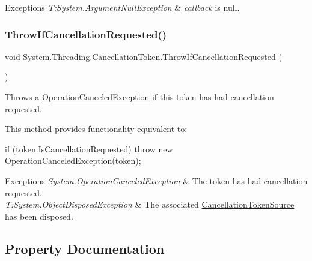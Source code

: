 \begin{DoxyExceptions}{Exceptions}
{\em T\+:\+System.\+Argument\+Null\+Exception} & {\itshape callback}  is null.\\
\hline
\end{DoxyExceptions}
\mbox{\label{struct_system_1_1_threading_1_1_cancellation_token_ab98969cae74910bdbdde565b167c5499}} 
\subsubsection{\texorpdfstring{Throw\+If\+Cancellation\+Requested()}{ThrowIfCancellationRequested()}}
{\footnotesize\ttfamily void System.\+Threading.\+Cancellation\+Token.\+Throw\+If\+Cancellation\+Requested (\begin{DoxyParamCaption}{ }\end{DoxyParamCaption})\hspace{0.3cm}{\ttfamily [inline]}}



Throws a \hyperlink{}{Operation\+Canceled\+Exception} if this token has had cancellation requested. 

This method provides functionality equivalent to\+: 
\begin{DoxyCode}
\textcolor{keywordflow}{if} (token.IsCancellationRequested) 
   \textcolor{keywordflow}{throw} \textcolor{keyword}{new} OperationCanceledException(token);
\end{DoxyCode}
 


\begin{DoxyExceptions}{Exceptions}
{\em System.\+Operation\+Canceled\+Exception} & The token has had cancellation requested.\\
\hline
{\em T\+:\+System.\+Object\+Disposed\+Exception} & The associated \hyperlink{}{Cancellation\+Token\+Source} has been disposed.\\
\hline
\end{DoxyExceptions}


\subsection{Property Documentation}
\mbox{\label{struct_system_1_1_threading_1_1_cancellation_token_ae9726dbc54733ce5d174707fc596b8e9}} 
